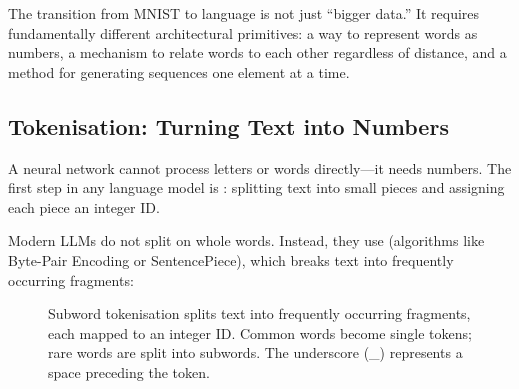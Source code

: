 \begin{keyinsight}
The transition from MNIST to language is not just ``bigger data.'' It
requires fundamentally different architectural primitives: a way to
represent words as numbers, a mechanism to relate words to each other
regardless of distance, and a method for generating sequences one
element at a time.
\end{keyinsight}

\subsection{Tokenisation: Turning Text into Numbers}
\label{sec:tokenisation}

A neural network cannot process letters or words directly---it needs
numbers. The first step in any language model is :
splitting text into small pieces and assigning each piece an integer ID.

Modern LLMs do not split on whole words. Instead, they use
 (algorithms like Byte-Pair Encoding or
SentencePiece), which breaks text into frequently occurring fragments:

\begin{figure}[htbp]
\centering
{}
\caption{Subword tokenisation splits text into frequently occurring
  fragments, each mapped to an integer ID. Common words become single
  tokens; rare words are split into subwords. The underscore
  (\_) represents a space preceding the token.}
\label{fig:tokenisation}
\end{figure}

